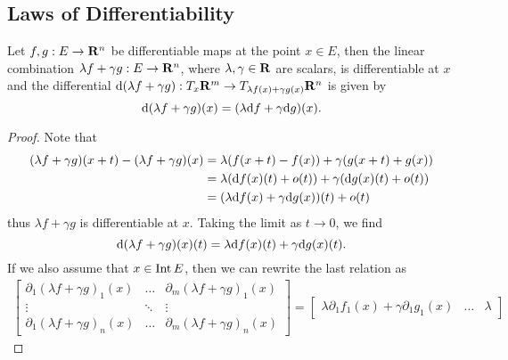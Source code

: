 \subsection{Laws of Differentiability}

\begin{theorem}\label{thm: diff-linear}
    Let \(f, g: E \to \mathbf{R}^n\) be differentiable maps at the point \(x \in E\), then
    the linear combination \(\lambda f + \gamma g: E \to \mathbf{R}^n\), where \(\lambda,
    \gamma \in \mathbf{R}\) are scalars, is differentiable at \(x\) and the differential
    \(\mathrm{d}(\lambda f + \gamma g): T_x\mathbf{R}^m \to T_{\lambda f(x) + \gamma
            g(x)}\mathbf{R}^n\) is given by
    \[
        \mathrm{d} (\lambda f + \gamma g)(x) = (\lambda \mathrm{d} f + \gamma \mathrm{d} g)(x).
    \]
\end{theorem}

\begin{proof}
    Note that
    \begin{align*}
        (\lambda f + \gamma g)(x + t) - (\lambda f + \gamma g)(x)
         & = \lambda (f(x + t) - f(x)) + \gamma (g(x + t) + g(x))         \\
         & = \lambda(\mathrm{d} f(x)(t) + o(t)) + \gamma(\mathrm{d} g(x)(t) + o(t)) \\
         & = (\lambda \mathrm{d} f(x) + \gamma \mathrm{d} g(x))(t) + o(t)
    \end{align*}
    thus \(\lambda f + \gamma g\) is differentiable at \(x\). Taking the limit as
    \(t \to 0\), we find
    \[
        \mathrm{d}(\lambda f + \gamma g)(x)(t)
        = \lambda \mathrm{d} f(x)(t) + \gamma \mathrm{d} g(x)(t).
    \]
    If we also assume that \(x \in \operatorname{Int} E\), then we can rewrite the last relation
    as
        {\small%
            \begin{align*}
                \begin{bmatrix}
                    \partial_1 (\lambda f + \gamma g)_1(x) & \dots  & \partial_m (\lambda f +
                    \gamma g)_1(x)                                                            \\
                    \vdots                                 & \ddots & \vdots                  \\
                    \partial_1 (\lambda f + \gamma g)_n(x) & \dots  & \partial_m(\lambda f +
                    \gamma g)_n(x)
                \end{bmatrix}
                =
                \begin{bmatrix}
                    \lambda \partial_1 f_1(x) + \gamma \partial_1 g_1(x) & \dots  & \lambda

\end{bmatrix}
\end{align*}}
\end{proof}
